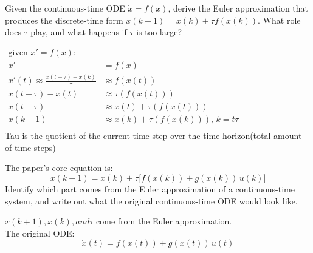 Given the continuous-time ODE $\dot{x} = f(x)$, derive the Euler approximation that produces the discrete-time form $x(k+1) = x(k) + \tau f(x(k))$. What role does $\tau$ play, and what happens if $\tau$ is too large?

\begin{answerbox}
	\begin{math}
		\begin{aligned}
			\text{given $x\prime = f(x)$:}                                                                           \\
			x\prime                                             & = f(x)                                             \\
			x\prime(t) \approx  \frac{x(t + \tau) - x(k)}{\tau} & \approx f(x(t))                                    \\
			x(t + \tau) - x(t)                                  & \approx \tau( f(x(t)) )                            \\
			x(t + \tau)                                         & \approx x(t) + \tau( f(x(t)) )                     \\
			x(k + 1)                                            & \approx x(k) + \tau( f(x(k)) )\text{, $k = t\tau$} \\
		\end{aligned}
	\end{math} \\
	Tau is the quotient of the current time step over
	the time horizon(total amount of time steps)
\end{answerbox}

The paper's core equation is:
\[
	x(k+1) = x(k) + \tau\bigl[f(x(k)) + g(x(k))\,u(k)\bigr]
\]
Identify which part comes from the Euler approximation of a
continuous-time system, and write out what the original
continuous-time ODE would look like.

\begin{answerbox}
	$x(k+1), x(k), and \tau$ come from the Euler approximation. \\
	The original ODE:
	\begin{equation}
		\dot{x}(t) = f(x(t)) + g(x(t))\,u(t)
	\end{equation} \\ \\
\end{answerbox}

